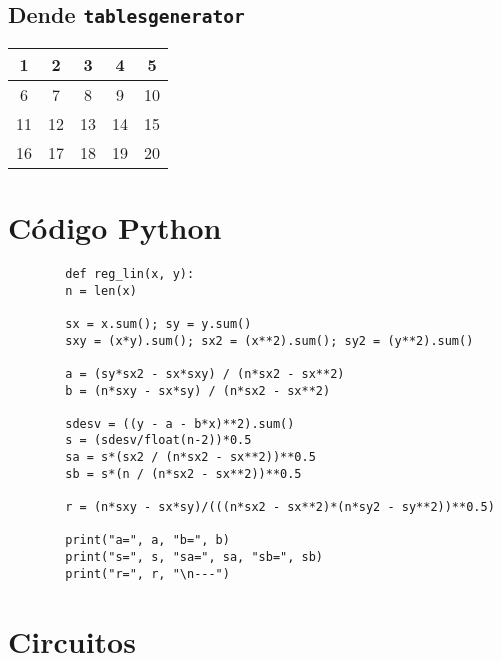 \documentclass[12pt, titlepage]{article}
\begin{document}
    \subsection{Dende \texttt{tablesgenerator}}
    
          {\begin{tabular}{|c|c|c|c|c|}
                \hline
                \rowcolor[HTML]{FBBCBA}
                1  & 2  & 3  & 4  & 5  \\ \hline
                \rowcolor[HTML]{FFEDB7}
                6  & 7  & 8  & 9  & 10 \\ \hline
                \rowcolor[HTML]{D0F2A7}
                11 & 12 & 13 & 14 & 15 \\ \hline
                \rowcolor[HTML]{D0E2F9}
                16 & 17 & 18 & 19 & 20 \\ \hline
            \end{tabular}}


    \section{Código Python}

    \begin{verbatim}
        def reg_lin(x, y):
        n = len(x)
    
        sx = x.sum(); sy = y.sum()
        sxy = (x*y).sum(); sx2 = (x**2).sum(); sy2 = (y**2).sum()
    
        a = (sy*sx2 - sx*sxy) / (n*sx2 - sx**2)
        b = (n*sxy - sx*sy) / (n*sx2 - sx**2)
    
        sdesv = ((y - a - b*x)**2).sum()
        s = (sdesv/float(n-2))*0.5
        sa = s*(sx2 / (n*sx2 - sx**2))**0.5
        sb = s*(n / (n*sx2 - sx**2))**0.5
    
        r = (n*sxy - sx*sy)/(((n*sx2 - sx**2)*(n*sy2 - sy**2))**0.5)
    
        print("a=", a, "b=", b)
        print("s=", s, "sa=", sa, "sb=", sb)
        print("r=", r, "\n---")
    \end{verbatim}


    \section{Circuitos}
\end{document}
